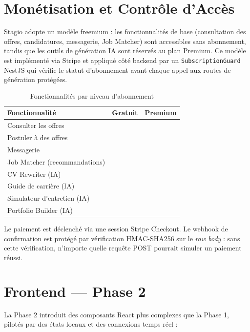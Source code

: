 ﻿\documentclass[12pt,a4paper]{report}
\newcommand{\cmark}{\ding{51}}
\newcommand{\xmark}{\ding{55}}
\begin{document}
\section{Monétisation et Contrôle d'Accès}

Stagio adopte un modèle freemium : les fonctionnalités de base (consultation des offres, candidatures, messagerie, Job Matcher) sont accessibles sans abonnement, tandis que les outils de génération IA sont réservés au plan Premium. Ce modèle est implémenté via Stripe et appliqué côté backend par un \texttt{SubscriptionGuard} NestJS qui vérifie le statut d'abonnement avant chaque appel aux routes de génération protégées.

\begin{table}[H]
\centering
\begin{tabular}{lcc}
\toprule
\textbf{Fonctionnalité} & \textbf{Gratuit} & \textbf{Premium} \\
\midrule
Consulter les offres & \cmark & \cmark \\
Postuler à des offres & \cmark & \cmark \\
Messagerie & \cmark & \cmark \\
Job Matcher (recommandations) & \cmark & \cmark \\
CV Rewriter (IA) & \xmark & \cmark \\
Guide de carrière (IA) & \xmark & \cmark \\
Simulateur d'entretien (IA) & \xmark & \cmark \\
Portfolio Builder (IA) & \xmark & \cmark \\
\bottomrule
\end{tabular}
\caption{Fonctionnalités par niveau d'abonnement}
\end{table}

Le paiement est déclenché via une session Stripe Checkout. Le webhook de confirmation est protégé par vérification HMAC-SHA256 sur le \textit{raw body} : sans cette vérification, n'importe quelle requête POST pourrait simuler un paiement réussi.

\section{Frontend — Phase 2}

La Phase 2 introduit des composants React plus complexes que la Phase 1, pilotés par des états locaux et des connexions temps réel :
\end{document}
